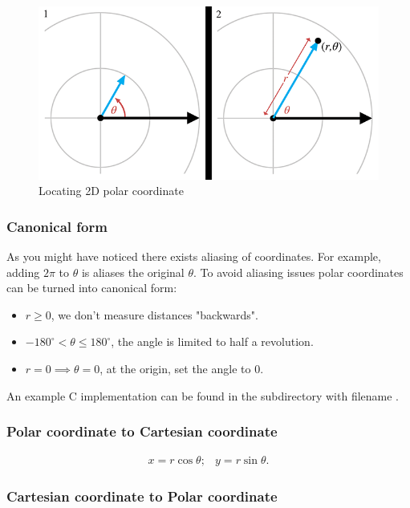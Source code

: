 \documentclass[a4paper,11pt]{article}
\begin{document}
\begin{figure}[H]
\centering
    \includegraphics{07_2d_polar_coordinate}
\caption{Locating 2D polar coordinate}
\label{fig:locating-2d-polar-coordinate}
\end{figure}

\subsubsection{Canonical form}

As you might have noticed there exists aliasing of coordinates. For example, adding $2\pi$ to $\theta$ is aliases the original $\theta$. To avoid aliasing issues polar coordinates can be turned into canonical form:

\begin{itemize}
	\item $r \geq 0$, we don't measure distances "backwards".
	\item $-180^\circ < \theta \leq 180^\circ$, the angle is limited to half a revolution.
	\item $r=0 \implies \theta=0$, at the origin, set the angle to $0$.
\end{itemize}

An example C implementation can be found in the  subdirectory with filename .

\subsubsection{Polar coordinate to Cartesian coordinate}

$$
\begin{array}{lr}
x=r\cos\theta; & y=r\sin\theta.
\end{array}
$$

\subsubsection{Cartesian coordinate to Polar coordinate}
\end{document}
